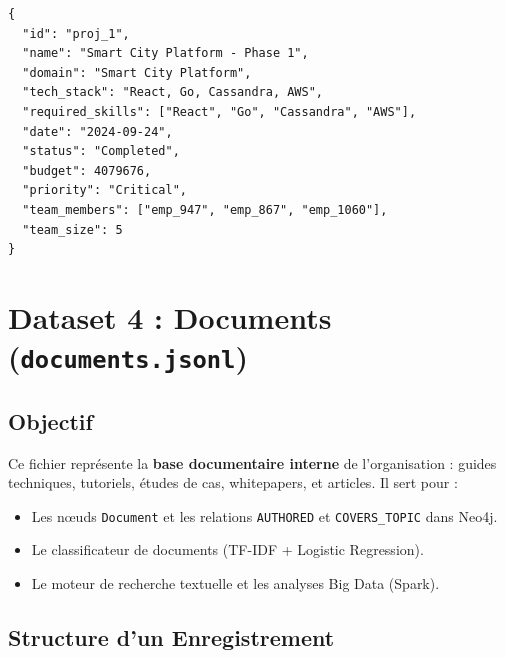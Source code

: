 \documentclass[12pt,a4paper]{article}
\begin{document}
\begin{lstlisting}[language={}]
{
  "id": "proj_1",
  "name": "Smart City Platform - Phase 1",
  "domain": "Smart City Platform",
  "tech_stack": "React, Go, Cassandra, AWS",
  "required_skills": ["React", "Go", "Cassandra", "AWS"],
  "date": "2024-09-24",
  "status": "Completed",
  "budget": 4079676,
  "priority": "Critical",
  "team_members": ["emp_947", "emp_867", "emp_1060"],
  "team_size": 5
}
\end{lstlisting}

\section{Dataset 4 : Documents (\texttt{documents.jsonl})}

\subsection{Objectif}

Ce fichier représente la \textbf{base documentaire interne} de l'organisation : guides techniques, tutoriels, études de cas, whitepapers, et articles. Il sert pour :
\begin{itemize}[leftmargin=*]
    \item Les nœuds \texttt{Document} et les relations \texttt{AUTHORED} et \texttt{COVERS\_TOPIC} dans Neo4j.
    \item Le classificateur de documents (TF-IDF + Logistic Regression).
    \item Le moteur de recherche textuelle et les analyses Big Data (Spark).
\end{itemize}

\subsection{Structure d'un Enregistrement}
\end{document}
